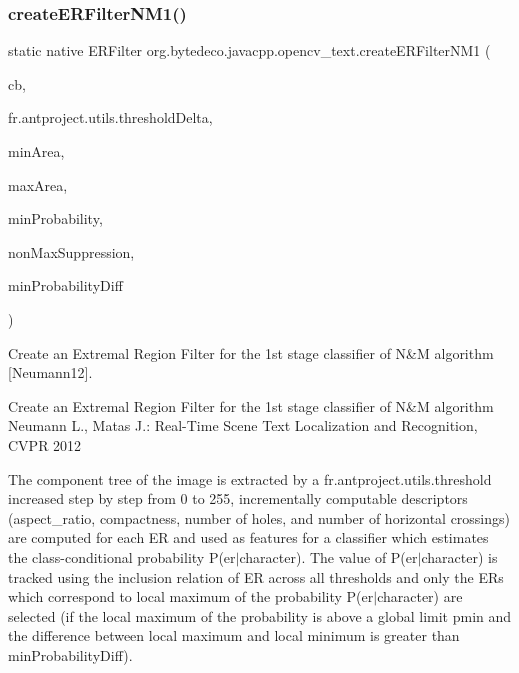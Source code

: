 \subsubsection{\texorpdfstring{create\+E\+R\+Filter\+N\+M1()}{createERFilterNM1()}}
{\footnotesize\ttfamily static native E\+R\+Filter org.\+bytedeco.\+javacpp.\+opencv\+\_\+text.\+create\+E\+R\+Filter\+N\+M1 (\begin{DoxyParamCaption}\item[{@Ptr E\+R\+Filter.\+Callback}]{cb,  }\item[{int}]{fr.antproject.utils.threshold\+Delta,  }\item[{float}]{min\+Area,  }\item[{float}]{max\+Area,  }\item[{float}]{min\+Probability,  }\item[{@Cast(\char`\"{}bool\char`\"{}) boolean}]{non\+Max\+Suppression,  }\item[{float}]{min\+Probability\+Diff }\end{DoxyParamCaption})\hspace{0.3cm}{\ttfamily [static]}}



Create an Extremal Region Filter for the 1st stage classifier of N\&M algorithm \mbox{[}Neumann12\mbox{]}. 

Create an Extremal Region Filter for the 1st stage classifier of N\&M algorithm Neumann L., Matas J.\+: Real-\/\+Time Scene Text Localization and Recognition, C\+V\+PR 2012 

The component tree of the image is extracted by a fr.antproject.utils.threshold increased step by step from 0 to 255, incrementally computable descriptors (aspect\+\_\+ratio, compactness, number of holes, and number of horizontal crossings) are computed for each ER and used as features for a classifier which estimates the class-\/conditional probability P(er$\vert$character). The value of P(er$\vert$character) is tracked using the inclusion relation of ER across all thresholds and only the E\+Rs which correspond to local maximum of the probability P(er$\vert$character) are selected (if the local maximum of the probability is above a global limit pmin and the difference between local maximum and local minimum is greater than min\+Probability\+Diff).


